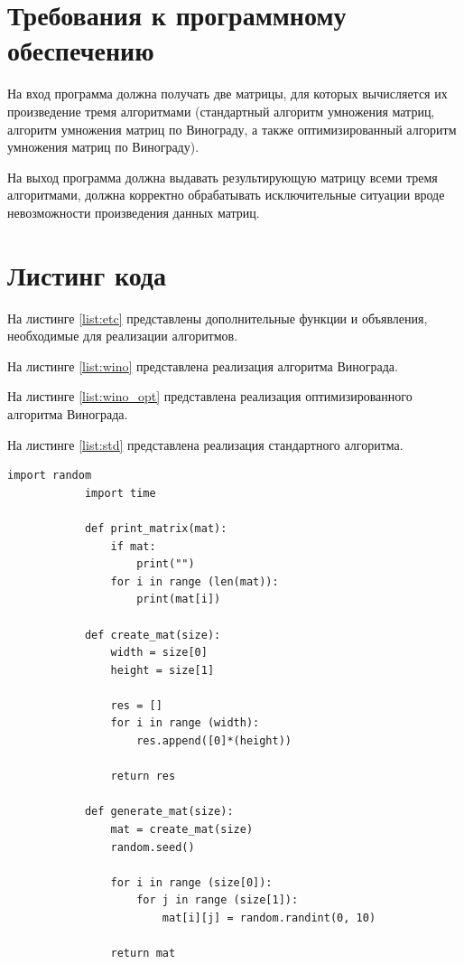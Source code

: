 \documentclass[a4paper,12pt]{report}
\begin{document}
	\section{Требования к программному обеспечению}

На вход программа должна получать две матрицы, для которых вычисляется их произведение тремя алгоритмами (стандартный алгоритм умножения матриц, алгоритм умножения матриц по Винограду, а также оптимизированный алгоритм умножения матриц по Винограду).

На выход программа должна выдавать результирующую матрицу всеми тремя алгоритмами, должна корректно обрабатывать исключительные ситуации вроде невозможности произведения данных матриц.

	\section{Листинг кода}

        	На листинге \ref{list:etc} представлены дополнительные функции и объявления, необходимые для реализации алгоритмов.
        	
        	На листинге \ref{list:wino} представлена реализация алгоритма Винограда.
        	
			На листинге \ref{list:wino_opt} представлена реализация оптимизированного алгоритма Винограда.

			На листинге \ref{list:std} представлена реализация стандартного алгоритма.
        
        \begin{lstlisting}[frame = single, breaklines, caption = Вспомогательные функции и объявления, label=list:etc]
	        import random
	        import time
	        
	        def print_matrix(mat):
	        	if mat:
	        		print("")
	        	for i in range (len(mat)):
	        		print(mat[i])
	        
	        def create_mat(size):
	        	width = size[0]
	        	height = size[1]
	        
	        	res = []
	        	for i in range (width):
	        		res.append([0]*(height))
	        
	        	return res
	        
	        def generate_mat(size):
	        	mat = create_mat(size)
	        	random.seed()
	        
	        	for i in range (size[0]):
	        		for j in range (size[1]):
	        			mat[i][j] = random.randint(0, 10)
	        
	        	return mat
	    \end{lstlisting}  
	   
\end{document}
